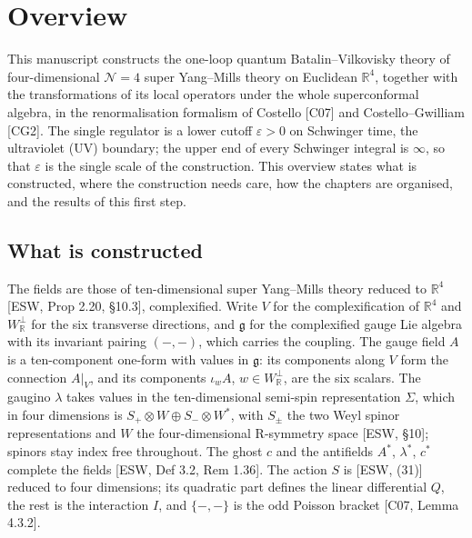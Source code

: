 \chapter{Overview}

This manuscript constructs the one-loop quantum Batalin--Vilkovisky theory of four-dimensional $\mathcal N=4$ super Yang--Mills theory on Euclidean $\mathbb R^4$, together with the transformations of its local operators under the whole superconformal algebra, in the renormalisation formalism of Costello [C07] and Costello--Gwilliam [CG2]. The single regulator is a lower cutoff $\varepsilon>0$ on Schwinger time, the ultraviolet (UV) boundary; the upper end of every Schwinger integral is $\infty$, so that $\varepsilon$ is the single scale of the construction. This overview states what is constructed, where the construction needs care, how the chapters are organised, and the results of this first step.

\section{What is constructed}

The fields are those of ten-dimensional super Yang--Mills theory reduced to $\mathbb R^4$ [ESW, Prop 2.20, §10.3], complexified. Write $V$ for the complexification of $\mathbb R^4$ and $W_{\mathbb R}^\perp$ for the six transverse directions, and $\mathfrak g$ for the complexified gauge Lie algebra with its invariant pairing $(-,-)$, which carries the coupling. The gauge field $A$ is a ten-component one-form with values in $\mathfrak g$: its components along $V$ form the connection $A|_V$, and its components $\iota_wA$, $w\in W_{\mathbb R}^\perp$, are the six scalars. The gaugino $\lambda$ takes values in the ten-dimensional semi-spin representation $\Sigma$, which in four dimensions is $S_+\otimes W\oplus S_-\otimes W^*$, with $S_\pm$ the two Weyl spinor representations and $W$ the four-dimensional R-symmetry space [ESW, §10]; spinors stay index free throughout. The ghost $c$ and the antifields $A^*$, $\lambda^*$, $c^*$ complete the fields [ESW, Def 3.2, Rem 1.36]. The action $S$ is [ESW, (31)] reduced to four dimensions; its quadratic part defines the linear differential $Q$, the rest is the interaction $I$, and $\{-,-\}$ is the odd Poisson bracket [C07, Lemma 4.3.2].

